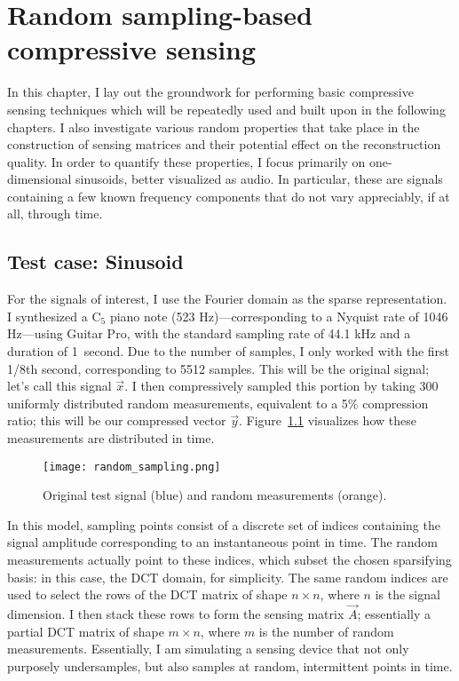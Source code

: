 \chapter{Random sampling-based compressive sensing}
\label{chap:random-cs}

In this chapter, I lay out the groundwork for performing basic compressive sensing techniques which will be repeatedly used and built upon in the following chapters. I also investigate various random properties that take place in the construction of sensing matrices and their potential effect on the reconstruction quality. In order to quantify these properties, I focus primarily on one-dimensional sinusoids, better visualized as audio. In particular, these are signals containing a few known frequency components that do not vary appreciably, if at all, through time.

\section{Test case: Sinusoid}
\label{sec:1dsin}
For the signals of interest, I use the Fourier domain as the sparse representation. I synthesized a C$_5$ piano note (523 Hz)---corresponding to a Nyquist rate of 1046 Hz---using Guitar Pro, with the standard sampling rate of 44.1 kHz and a duration of 1~second. Due to the number of samples, I only worked with the first 1/8th second, corresponding to 5512 samples. This will be the original signal; let's call this signal $\vec{x}$. I then compressively sampled this portion by taking 300 uniformly distributed random measurements, equivalent to a 5\% compression ratio; this will be our compressed vector $\vec{y}$. Figure~\ref{fig:random-sampling} visualizes how these measurements are distributed in time.

\begin{figure}[htb]
	\texttt{[image: random\_sampling.png]}
	\caption{Original test signal (blue) and random measurements (orange).}
	\label{fig:random-sampling}
\end{figure}

In this model, sampling points consist of a discrete set of indices containing the signal amplitude corresponding to an instantaneous point in time. The random measurements actually point to these indices, which subset the chosen sparsifying basis: in this case, the DCT domain, for simplicity. The same random indices are used to select the rows of the DCT matrix of shape $n \times n$, where $n$ is the signal dimension. I then stack these rows to form the sensing matrix $\vec{A}$; essentially a partial DCT matrix of shape $m \times n$, where $m$ is the number of random measurements. Essentially, I am simulating a sensing device that not only purposely undersamples, but also samples at random, intermittent points in time.

